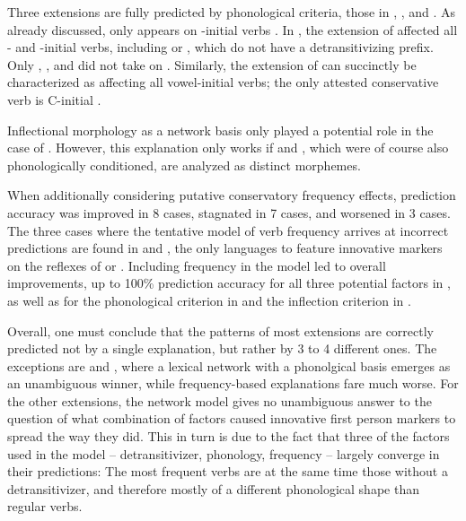 Three extensions are fully predicted by phonological criteria, those in \akuriyo, \carijo, and \yukpa.
As already discussed, \akuriyo {} only appears on -initial verbs .
In \carijo, the extension of  affected all - and -initial verbs, including   or  , which do not have a detransitivizing prefix.
Only  ,  , and   did not take on .
Similarly, the extension of \yukpa {} can succinctly be characterized as affecting all vowel-initial verbs; the only attested conservative verb is C-initial  .

Inflectional morphology as a network basis only played a potential role in the case of \akuriyo.
However, this explanation only works if  and , which were of course also phonologically conditioned, are analyzed as distinct morphemes.

When additionally considering putative conservatory frequency effects, prediction accuracy was improved in 8 cases, stagnated in 7 cases, and worsened in 3 cases.
The three cases where the tentative model of verb frequency arrives at incorrect predictions are found in \carijo and \yukpa, the only languages to feature innovative markers on the reflexes of   or  .
Including frequency in the model led to overall improvements, up to 100\% prediction accuracy for all three potential factors in \PTir, as well as for the phonological criterion in \PPek and the inflection criterion in \PWai.

Overall, one must conclude that the patterns of most extensions are correctly predicted not by a single explanation, but rather by 3 to 4 different ones.
The exceptions are \carijo and \yukpa, where a lexical network with a phonolgical basis emerges as an unambiguous winner, while frequency-based explanations fare much worse.
For the other extensions, the network model gives no unambiguous answer to the question of what combination of factors caused innovative first person markers to spread the way they did.
This in turn is due to the fact that three of the factors used in the model -- detransitivizer, phonology, frequency -- largely converge in their predictions:
The most frequent verbs are at the same time those without a detransitivizer, and therefore mostly of a different phonological shape than regular  verbs.